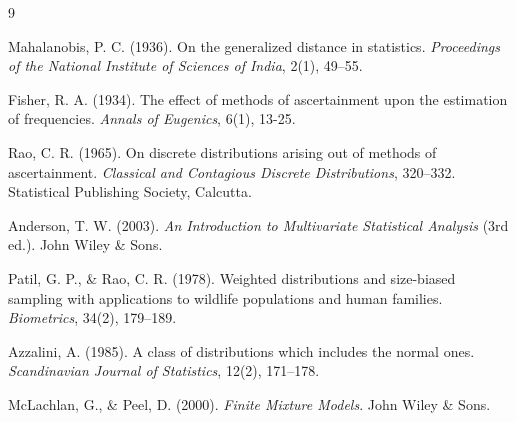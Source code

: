 \documentclass[twoside]{article}
\begin{document}
\begin{thebibliography}{9}
	
Mahalanobis, P. C. (1936). On the generalized distance in statistics. \textit{Proceedings of the National Institute of Sciences of India}, 2(1), 49--55.

Fisher, R. A. (1934). The effect of methods of ascertainment upon the estimation of frequencies. \textit{Annals of Eugenics}, 6(1), 13-25.


Rao, C. R. (1965). On discrete distributions arising out of methods of ascertainment. \textit{Classical and Contagious Discrete Distributions}, 320--332. Statistical Publishing Society, Calcutta.

Anderson, T. W. (2003). \textit{An Introduction to Multivariate Statistical Analysis} (3rd ed.). John Wiley \& Sons.

Patil, G. P., \& Rao, C. R. (1978). Weighted distributions and size-biased sampling with applications to wildlife populations and human families. \textit{Biometrics}, 34(2), 179--189.

Azzalini, A. (1985). A class of distributions which includes the normal ones. \textit{Scandinavian Journal of Statistics}, 12(2), 171--178.

McLachlan, G., \& Peel, D. (2000). \textit{Finite Mixture Models}. John Wiley \& Sons.

\end{thebibliography}
\end{document}
